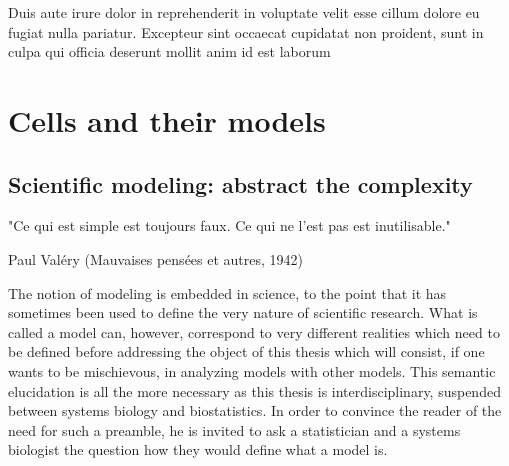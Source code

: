 \documentclass[a4paper,12pt,twoside,onecolumn,openright,final,oldfontcommands]{memoir}
\newcommand{\initial}[1]{
	\lettrine[lines=3,lhang=0.33,nindent=0em]{
		\color{gray}
     		{\textsc{#1}}}{}}
\newcommand\blankpage{%
    \null
    \thispagestyle{empty}%
    \newpage
    }
\newcommand{\clearemptydoublepage}{\newpage{\thispagestyle{empty}\cleardoublepage}}
\begin{document}
Duis aute irure dolor in reprehenderit in voluptate velit esse cillum
dolore eu fugiat nulla pariatur. Excepteur sint occaecat cupidatat non
proident, sunt in culpa qui officia deserunt mollit anim id est laborum

\clearemptydoublepage

\renewcommand{\contentsname}{Table of contents}


\tableofcontents*
{}
\newpage

\listoftables
{}
\newpage

\listoffigures
{}
\newpage

\blankpage


\part{Cells and their
models}\label{part-cells-and-their-models}

\chapter{Scientific modeling: abstract the
complexity}\label{scientific-modeling-abstract-the-complexity}

\epigraph{"Ce qui est simple est toujours faux. Ce qui ne l'est pas est inutilisable."}{Paul Valéry (Mauvaises pensées et autres, 1942)}

\initial{T}he notion of modeling is embedded in science, to the point
that it has sometimes been used to define the very nature of scientific
research. What is called a model can, however, correspond to very
different realities which need to be defined before addressing the
object of this thesis which will consist, if one wants to be
mischievous, in analyzing models with other models. This semantic
elucidation is all the more necessary as this thesis is
interdisciplinary, suspended between systems biology and biostatistics.
In order to convince the reader of the need for such a preamble, he is
invited to ask a statistician and a systems biologist the question how
they would define what a model is.
\end{document}

